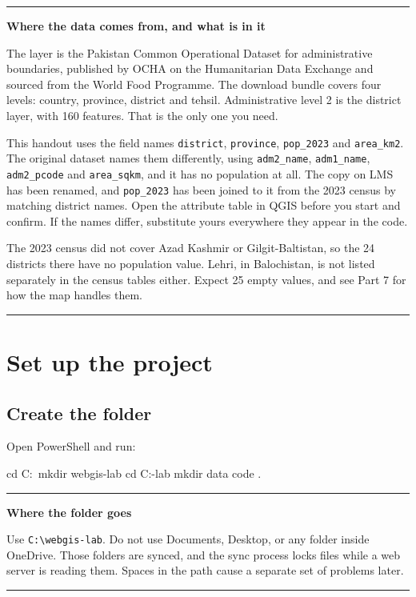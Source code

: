 \documentclass{article}
\newcommand{\cd}[1]{\texttt{#1}}
\newenvironment{keypoint}[1]
  {\par\vspace{.7em}\noindent\rule{\linewidth}{.6pt}\par\vspace{.15em}
   \noindent\textbf{#1}\par\nobreak\vspace{-.3em}}
  {\par\vspace{.15em}\noindent\rule{\linewidth}{.6pt}\par\vspace{.7em}}
\begin{document}
\begin{keypoint}{Where the data comes from, and what is in it}
The layer is the Pakistan Common Operational Dataset for administrative
boundaries, published by OCHA on the Humanitarian Data Exchange and
sourced from the World Food Programme. The download bundle covers four
levels: country, province, district and tehsil. Administrative level 2
is the district layer, with 160 features. That is the only one you need.

This handout uses the field names \cd{district}, \cd{province},
\cd{pop\_2023} and \cd{area\_km2}. The original dataset names them
differently, using \cd{adm2\_name}, \cd{adm1\_name}, \cd{adm2\_pcode} and
\cd{area\_sqkm}, and it has no population at all. The copy on LMS has
been renamed, and \cd{pop\_2023} has been joined to it from the 2023
census by matching district names. Open the attribute table in QGIS before
you start and confirm. If the names differ, substitute yours everywhere
they appear in the code.

The 2023 census did not cover Azad Kashmir or Gilgit-Baltistan, so the 24
districts there have no population value. Lehri, in Balochistan, is not
listed separately in the census tables either. Expect 25 empty values,
and see Part 7 for how the map handles them.
\end{keypoint}


\section{Set up the project}

\subsection{Create the folder}

Open PowerShell and run:

\begin{code}
cd C:\
mkdir webgis-lab
cd C:\webgis-lab
mkdir data
code .
\end{code}

\begin{keypoint}{Where the folder goes}
Use \cd{C:\textbackslash webgis-lab}. Do not use Documents, Desktop, or
any folder inside OneDrive. Those folders are synced, and the sync
process locks files while a web server is reading them. Spaces in the
path cause a separate set of problems later.
\end{keypoint}
\end{document}
